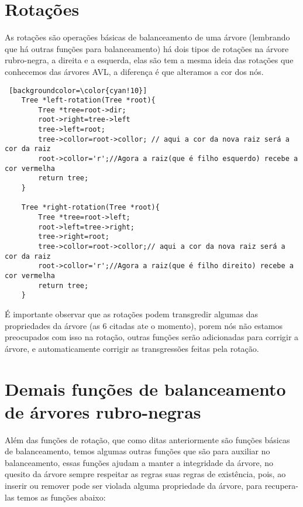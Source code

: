 \documentclass[report]{uftex}
\begin{document}
\section{Rotações}
\label{sec:rotacoes}

    As rotações são operações básicas de balanceamento de uma árvore (lembrando que há outras funções para balanceamento) há dois tipos de rotações na árvore rubro-negra, a direita e a esquerda, elas são tem a mesma ideia das rotações que conhecemos das árvores AVL, a diferença é que alteramos a cor dos nós.

\begin{lstlisting} [backgroundcolor=\color{cyan!10}]
    Tree *left-rotation(Tree *root){
        Tree *tree=root->dir;
        root->right=tree->left
        tree->left=root;
        tree->collor=root->collor; // aqui a cor da nova raiz será a cor da raiz
        root->collor='r';//Agora a raiz(que é filho esquerdo) recebe a cor vermelha
        return tree;
    }

    Tree *right-rotation(Tree *root){
        Tree *tree=root->left;
        root->left=tree->right;
        tree->right=root;
        tree->collor=root->collor;// aqui a cor da nova raiz será a cor da raiz
        root->collor='r';//Agora a raiz(que é filho direito) recebe a cor vermelha
        return tree;
    }
\end{lstlisting}

    É importante observar que as rotações podem transgredir algumas das propriedades da árvore (as 6 citadas ate o momento), porem nós não estamos preocupados com isso na rotação, outras funções serão adicionadas para corrigir a árvore, e automaticamente corrigir as transgressões feitas pela rotação.

\section{Demais funções de balanceamento de árvores rubro-negras}
\label{sec:balanceamento}
    
    \noindent Além das funções de rotação, que como ditas anteriormente são funções básicas de balanceamento, temos algumas outras funções que são para auxiliar no balanceamento, essas funções ajudam a manter a integridade da árvore, no quesito da árvore sempre respeitar as regras suas regras de existência, pois, ao inserir ou remover pode ser violada alguma propriedade da árvore, para recupera-las temos as funções abaixo:\\
    
\end{document}
